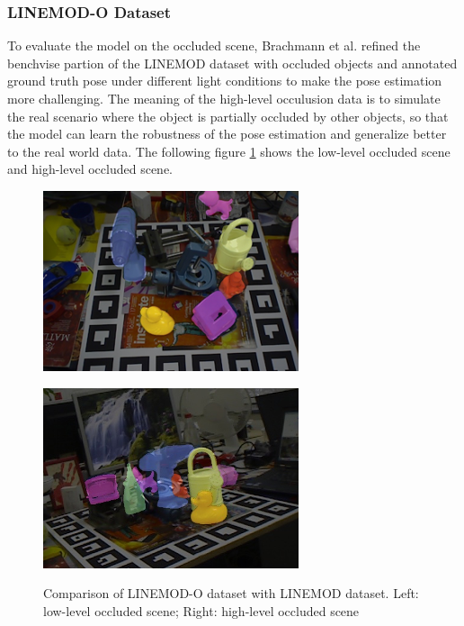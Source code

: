 \documentclass[12pt,DIV14,BCOR12mm,a4paper,footinclude=false,headinclude,parskip=half-,twoside,openright,cleardoublepage=empty,toc=index,bibliography=totoc,listof=totoc]{scrreprt}
\numberwithin{equation}{chapter}
\begin{document}
\subsubsection{LINEMOD-O Dataset}
To evaluate the model on the occluded scene, Brachmann et al. \cite{dataV4MUMX2020} refined the benchvise partion of the LINEMOD dataset with occluded objects and annotated ground truth pose under different light conditions to make the pose estimation more challenging. The meaning of the high-level occulusion data is to simulate the real scenario where the object is partially occluded by other objects, so that the model can learn the robustness of the pose estimation and generalize better to the real world data. The following figure \ref{img:linemod_o} shows the low-level occluded scene and high-level occluded scene.
\begin{figure}[h]
  \centering
  \begin{minipage}{.5\textwidth}
    \centering
    \includegraphics[scale=.6]{img/nooclu.png}
    \label{img:nooclu}
  \end{minipage}%
  \begin{minipage}{.5\textwidth}
    \centering
    \includegraphics[scale=.6]{img/oclu.png}
    \label{img:oclu}
  \end{minipage}
  \caption{Comparison of LINEMOD-O dataset with LINEMOD dataset. Left: low-level occluded scene; Right: high-level occluded scene}
  \label{img:linemod_o}
\end{figure}
\end{document}
